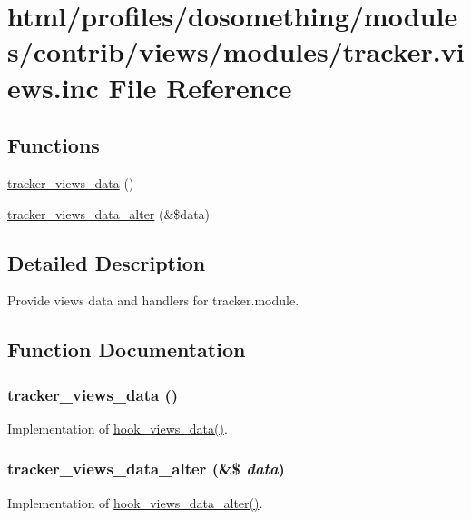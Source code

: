 \hypertarget{tracker_8views_8inc}{
\section{html/profiles/dosomething/modules/contrib/views/modules/tracker.views.inc File Reference}
\label{tracker_8views_8inc}
}
\subsection*{Functions}
\begin{DoxyCompactItemize}
\item 
\hyperlink{tracker_8views_8inc_a119ad3c35f2ba8b782b9e53ca09a337b}{tracker\_\-views\_\-data} ()
\item 
\hyperlink{tracker_8views_8inc_ab88fc2f93900ef43c9f5ef2bc54603a6}{tracker\_\-views\_\-data\_\-alter} (\&\$data)
\end{DoxyCompactItemize}


\subsection{Detailed Description}
Provide views data and handlers for tracker.module. 

\subsection{Function Documentation}
\hypertarget{tracker_8views_8inc_a119ad3c35f2ba8b782b9e53ca09a337b}{
\subsubsection[{tracker\_\-views\_\-data}]{\setlength{\rightskip}{0pt plus 5cm}tracker\_\-views\_\-data ()}}
\label{tracker_8views_8inc_a119ad3c35f2ba8b782b9e53ca09a337b}
Implementation of \hyperlink{group__views__hooks_ga227057901681e4a33e33c199c7a8c989}{hook\_\-views\_\-data()}. \hypertarget{tracker_8views_8inc_ab88fc2f93900ef43c9f5ef2bc54603a6}{
\subsubsection[{tracker\_\-views\_\-data\_\-alter}]{\setlength{\rightskip}{0pt plus 5cm}tracker\_\-views\_\-data\_\-alter (\&\$ {\em data})}}
\label{tracker_8views_8inc_ab88fc2f93900ef43c9f5ef2bc54603a6}
Implementation of \hyperlink{group__views__hooks_ga6ae0bb0d2385e03c32b57625b6d35826}{hook\_\-views\_\-data\_\-alter()}. 